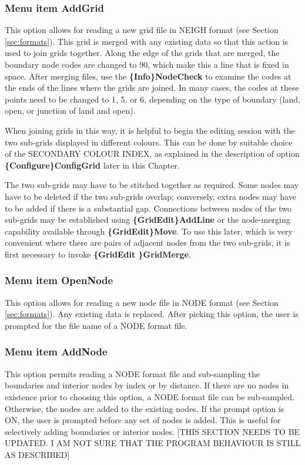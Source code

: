 \documentclass{article}
\begin{document}
\subsubsection[Menu item AddGrid]{Menu item AddGrid}
This option allows for reading a new grid file in NEIGH format (see Section \ref{sec:formats}). This grid is merged with any existing data so that this action is used to join grids together. Along the edge of the grids that are merged, the boundary node codes are changed to 90, which make this a line that is fixed in space. After merging files, use the \textbf{\{Info\}NodeCheck} to examine the codes at the ends of the lines where the grids are joined. In many cases, the codes at these points need to be changed to 1, 5, or 6, depending on the type of boundary (land, open, or junction of land and open).

When joining grids in this way, it is helpful to begin the editing session with the two sub-grids displayed in different colours. This can be done by suitable choice of the SECONDARY COLOUR INDEX, as explained in the description of option \textbf{\{Configure\}ConfigGrid} later in this Chapter.

The two sub-grids may have to be stitched together as required. Some nodes may have to be deleted if the two sub-grids overlap; conversely, extra nodes may have to be added if there is a substantial gap. Connections between nodes of the two sub-grids may be established using \textbf{\{GridEdit\}AddLine} or the node-merging capability available through \textbf{\{GridEdit\}Move}. To use this later, which is very convenient where there are pairs of adjacent nodes from the two sub-grids, it is first necessary to invoke \textbf{\{GridEdit \}GridMerge}.

\subsubsection[Menu item OpenNode]{Menu item OpenNode}
This option allows for reading a new node file in NODE format (see Section \ref{sec:formats}). Any existing data is replaced. After picking this option, the user is prompted for the file name of a NODE format file.

\subsubsection[Menu item AddNode]{Menu item AddNode}
This option permits reading a NODE format file and sub-sampling the boundaries and interior nodes by index or by distance. If there are no nodes in existence prior to choosing this option, a NODE format file can be sub-sampled. Otherwise, the nodes are added to the existing nodes. If the prompt option is ON, the user is prompted before any set of nodes is added. This is useful for selectively adding boundaries or interior nodes. [THIS SECTION NEEDS TO BE UPDATED.  I AM NOT SURE THAT THE PROGRAM BEHAVIOUR IS STILL AS DESCRIBED]
\end{document}
